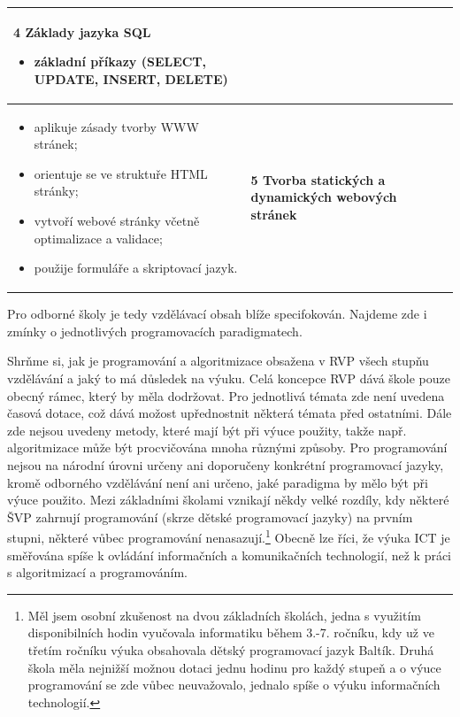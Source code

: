\documentclass[FP,DP]{tulthesis}
\begin{document}
{{\begin{table}[ht]
\begin{tabular}{|l|l|}
\begin{minipage}[t]{0.45\textwidth}
\textbf{4 Základy jazyka SQL}
    \begin{itemize}[leftmargin=*,nosep]
  \item základní příkazy (SELECT, UPDATE, INSERT, DELETE)
\end{itemize}
  \end{minipage}\\\hline
  \begin{minipage}[t]{0.45\textwidth}
\begin{itemize}[leftmargin=*,nosep]
  	\item aplikuje zásady tvorby WWW stránek; 
	\item orientuje se ve struktuře HTML stránky;
  	\item vytvoří webové stránky včetně optimalizace a validace; 
	\item použije formuláře a skriptovací jazyk.
\end{itemize}
  \end{minipage} &
  \begin{minipage}[t]{0.45\textwidth}
\textbf{5 Tvorba statických a dynamických webových stránek }
  \end{minipage}\\\hline
\end{tabular}


\end{table}



Pro odborné školy je tedy vzdělávací obsah blíže specifokován. Najdeme zde i zmínky o jednotlivých programovacích paradigmatech. 


Shrňme si, jak je programování a algoritmizace obsažena v RVP všech stupňu vzdělávání a jaký to má důsledek na výuku.
Celá koncepce RVP dává škole pouze obecný rámec, který by měla dodržovat. Pro jednotlivá témata zde není uvedena časová dotace, což dává možost upřednostnit některá témata před ostatními. Dále zde nejsou uvedeny metody, které mají být při výuce použity, takže např. algoritmizace může být procvičována mnoha různými způsoby.  Pro programování nejsou na národní úrovni určeny ani doporučeny konkrétní programovací jazyky, kromě odborného vzdělávání není ani určeno, jaké paradigma by mělo být při výuce použito. Mezi základními školami vznikají někdy velké rozdíly, kdy některé ŠVP zahrnují programování (skrze dětské programovací jazyky) na prvním stupni, některé vůbec programování nenasazují.\footnote{Měl jsem osobní zkušenost na dvou základních školách, jedna s využitím disponibilních hodin vyučovala informatiku během 3.-7. ročníku, kdy už ve třetím ročníku výuka obsahovala dětský programovací jazyk Baltík. Druhá škola měla nejnižší možnou dotaci jednu hodinu pro každý stupeň a o výuce programování se zde vůbec neuvažovalo, jednalo spíše o výuku informačních technologií.} Obecně lze říci, že výuka ICT je směřována spíše k ovládání informačních a komunikačních technologií, než k práci s algoritmizací a programováním.

}}
\end{document}
